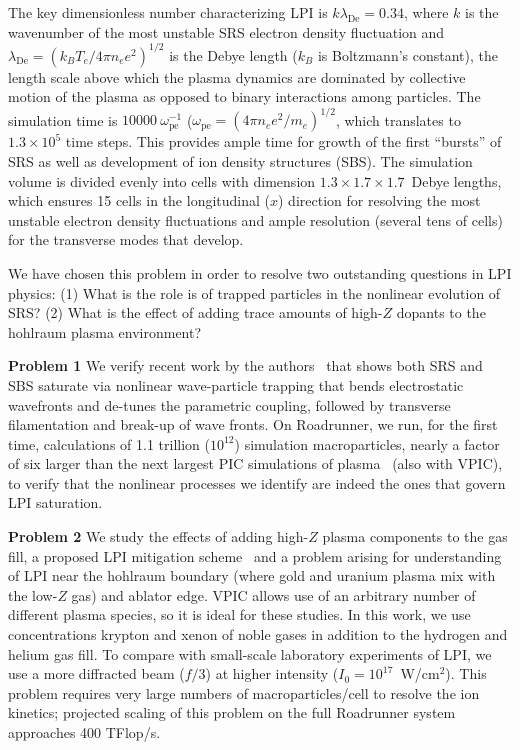 \documentclass[letter,10pt]{article}
\newcommand{\lde}      {\lambda_{\mathrm{De}}}
\newcommand{\wpe}      {\omega_{\mathrm{pe}}}
\begin{document}
The key dimensionless number characterizing LPI is $k \lde = 0.34$,
where $k$ is the wavenumber of the most unstable SRS electron density
fluctuation and $\lde = (k_B T_e / 4 \pi n_e e^2)^{1/2}$ is the Debye
length ($k_B$ is Boltzmann's constant), the length scale above which
the plasma dynamics are dominated by collective motion of the plasma
as opposed to binary interactions among particles.  The simulation
time is $10000~\wpe^{-1}$ ($\wpe = (4 \pi n_e e^2 / m_e)^{1/2}$, which
translates to $1.3 \times 10^5$ time steps.  This provides ample time
for growth of the first ``bursts'' of SRS as well as development of
ion density structures (SBS).  The simulation volume is divided evenly
into cells with dimension $1.3 \times 1.7 \times 1.7$~Debye lengths,
which ensures 15 cells in the longitudinal ($x$) direction for
resolving the most unstable electron density fluctuations and ample
resolution (several tens of cells) for the transverse modes that
develop.

We have chosen this problem in order to resolve two outstanding
questions in LPI physics: (1) What is the role is of trapped particles
in the nonlinear evolution of SRS?  (2) What is the effect of adding
trace amounts of high-$Z$ dopants to the hohlraum plasma environment?

\textbf{Problem 1}
We verify recent work by the authors~\cite{} that shows both SRS and
SBS saturate via nonlinear wave-particle trapping that bends
electrostatic wavefronts and de-tunes the parametric coupling,
followed by transverse filamentation and break-up of wave fronts.  On
Roadrunner, we run, for the first time, calculations of 1.1 trillion
($10^{12}$) simulation macroparticles, nearly a factor of six larger
than the next largest PIC simulations of plasma~\cite{} (also with
VPIC), to verify that the nonlinear processes we identify are indeed
the ones that govern LPI saturation.

\textbf{Problem 2}
We study the effects of adding high-$Z$ plasma components to the gas
fill, a proposed LPI mitigation scheme~\cite{} and a problem arising
for understanding of LPI near the hohlraum boundary (where gold and
uranium plasma mix with the low-$Z$ gas) and ablator edge.  VPIC
allows use of an arbitrary number of different plasma species, so it
is ideal for these studies.  In this work, we use concentrations
krypton and xenon of noble gases in addition to the hydrogen and
helium gas fill.  To compare with small-scale laboratory experiments
of LPI, we use a more diffracted beam ($f/3$) at higher intensity
($I_0 = 10^{17}$~W/cm$^2$). This problem requires very large numbers
of macroparticles/cell to resolve the ion kinetics; projected scaling
of this problem on the full Roadrunner system approaches 400 TFlop/s.
\end{document}
